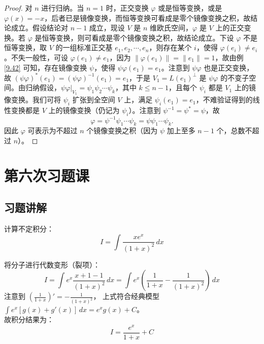 \documentclass[lang=cn,12pt]{elegantbook}
\begin{document}
\begin{proof}
对 \( n \) 进行归纳。当 \( n = 1 \) 时，正交变换 \(\varphi\) 或是恒等变换，或是 \(\varphi(x) = -x\)，后者已是镜像变换，而恒等变换可看成是零个镜像变换之积，故结论成立。假设结论对 \( n-1 \) 成立，现设 \( V \) 是 \( n \) 维欧氏空间，\(\varphi\) 是 \( V \) 上的正交变换。若 \(\varphi\) 是恒等变换，则可看成是零个镜像变换之积，故结论成立。下设 \(\varphi\) 不是恒等变换，取 \( V \) 的一组标准正交基 \( e_1, e_2, \cdots, e_n \)，则存在某个 \( i \)，使得 \(\varphi(e_i) \neq e_i\)。不失一般性，可设 \(\varphi(e_1) \neq e_1\)，因为 \(\|\varphi(e_1)\| = \|e_1\| = 1\)，故由例\ref{9.42} 可知，存在镜像变换 \(\psi\)，使得 \(\psi\varphi(e_1) = e_1\)。注意到 \(\psi\varphi\) 也是正交变换，故 \((\psi\varphi)^*(e_1) = (\psi\varphi)^{-1}(e_1) = e_1\)，于是 \( V_1 = L(e_1)^{\perp} \) 是 \(\psi\varphi\) 的不变子空间。由归纳假设，\(\psi\varphi|_{V_1} = \psi_1\psi_2\cdots\psi_k\)，其中 \( k \leq n-1 \)，且每个 \(\psi_i\) 都是 \( V_1 \) 上的镜像变换。我们可将 \(\psi_i\) 扩张到全空间 \( V \) 上，满足 \(\psi_i(e_1) = e_1\)，不难验证得到的线性变换都是 \( V \) 上的镜像变换（仍记为 \(\psi_i\)）。注意到 \(\psi^{-1} = \psi^* = \psi\)，故
\[
\varphi = \psi^{-1}\psi_1\cdots\psi_k = \psi\psi_1\cdots\psi_k.
\]
因此 \(\varphi\) 可表示为不超过 \( n \) 个镜像变换之积（因为 \(\psi\) 加上至多 \( n-1 \) 个，总数不超过 \( n \)）。
\end{proof}

\chapter{第六次习题课}

\section{习题讲解}

\begin{example}
计算不定积分：
\[ I = \int \frac{x e^x}{(1+x)^2} \, dx \]
\end{example}

\begin{solution}
    将分子进行代数变形（裂项）：
    \[ I = \int e^x \frac{x+1-1}{(1+x)^2} \, dx = \int e^x \left( \frac{1}{1+x} - \frac{1}{(1+x)^2} \right) \, dx \]
    注意到 $\left( \frac{1}{1+x} \right)' = -\frac{1}{(1+x)^2}$，
    上式符合经典模型 $\int e^x [g(x) + g'(x)] \, dx = e^x g(x) + C$。 \\
    故积分结果为：
    \[ I = \frac{e^x}{1+x} + C \]
\end{solution}
\end{document}

